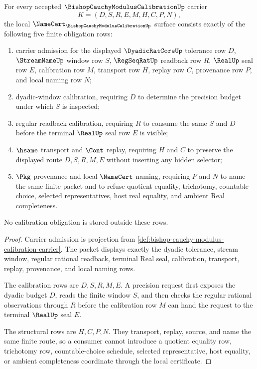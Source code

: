 \begin{theorem}
\label{thm:bishop-cauchy-modulus-calibration-namecert-obligations}
For every accepted $\BishopCauchyModulusCalibrationUp$ carrier
$$
K=(D,S,R,E,M,H,C,P,N),
$$
the local $\NameCert_{\BishopCauchyModulusCalibrationUp}$ surface consists exactly of the following five finite obligation rows:
\begin{enumerate}
\item carrier admission for the displayed $\DyadicRatCoreUp$ tolerance row $D$, $\StreamNameUp$ window row $S$, $\RegSeqRatUp$ readback row $R$, $\RealUp$ seal row $E$, calibration row $M$, transport row $H$, replay row $C$, provenance row $P$, and local naming row $N$;
\item dyadic-window calibration, requiring $D$ to determine the precision budget under which $S$ is inspected;
\item regular readback calibration, requiring $R$ to consume the same $S$ and $D$ before the terminal $\RealUp$ seal row $E$ is visible;
\item $\hsame$ transport and $\Cont$ replay, requiring $H$ and $C$ to preserve the displayed route $D,S,R,M,E$ without inserting any hidden selector;
\item $\Pkg$ provenance and local $\NameCert$ naming, requiring $P$ and $N$ to name the same finite packet and to refuse quotient equality, trichotomy, countable choice, selected representatives, host real equality, and ambient Real completeness.
\end{enumerate}
No calibration obligation is stored outside these rows.
\end{theorem}
\begin{proof}
Carrier admission is projection from \autoref{def:bishop-cauchy-modulus-calibration-carrier}. The packet displays exactly the dyadic tolerance, stream window, regular rational readback, terminal Real seal, calibration, transport, replay, provenance, and local naming rows.

The calibration rows are $D,S,R,M,E$. A precision request first exposes the dyadic budget $D$, reads the finite window $S$, and then checks the regular rational observations through $R$ before the calibration row $M$ can hand the request to the terminal $\RealUp$ seal $E$.

The structural rows are $H,C,P,N$. They transport, replay, source, and name the same finite route, so a consumer cannot introduce a quotient equality row, trichotomy row, countable-choice schedule, selected representative, host equality, or ambient completeness coordinate through the local certificate.
\end{proof}

